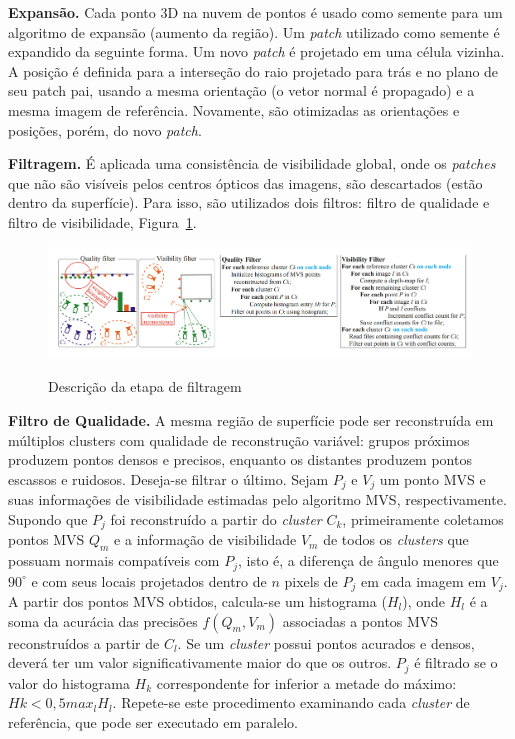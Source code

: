 \noindent\textbf{Expansão.}
Cada ponto 3D na nuvem de pontos é usado como semente para um algoritmo de
expansão (aumento da região). Um \emph{patch} utilizado como semente é expandido
da seguinte forma. Um novo \emph{patch} é projetado em uma célula vizinha.  A
posição é definida para a interseção do raio projetado para trás e no plano de
seu patch pai, usando a mesma orientação (o vetor normal é propagado) e a mesma
imagem de referência.  Novamente, são otimizadas as orientações e posições,
porém, do novo \emph{patch}.	

\noindent\textbf{Filtragem.}
É aplicada uma consistência de visibilidade global, onde os \emph{patches} que
não são visíveis pelos centros ópticos das imagens, são descartados (estão
dentro da superfície). Para isso, são utilizados dois filtros: filtro de
qualidade e filtro de visibilidade, Figura~\ref{fig:filtropmvs}.
\begin{figure}[!h]
	\centering
  \caption{Descrição da etapa de filtragem}
	\includegraphics[width=1\linewidth]{figs/filtropmvs.png}
  \label{fig:filtropmvs}
\end{figure} 

\noindent\textbf{Filtro de Qualidade.}
A mesma região de superfície pode ser reconstruída em múltiplos clusters com
qualidade de reconstrução variável: grupos próximos produzem pontos densos e
precisos, enquanto os distantes produzem pontos escassos e ruidosos.
Deseja-se filtrar o último.  Sejam $P_j$ e $V_j$ um ponto MVS
e suas informações de visibilidade estimadas pelo algoritmo MVS,
respectivamente. Supondo que $P_j$ foi reconstruído a partir do \emph{cluster}
$C_k$, primeiramente coletamos pontos MVS ${Q_m}$ e a informação de
visibilidade ${V_m}$ de todos os \emph{clusters} que possuam normais compatíveis
com $P_j$, isto é, a diferença de ângulo menores que $90^\circ$ e com seus locais
projetados dentro de $n$ pixels de $P_j$ em cada imagem em $V_j$. A partir dos
pontos MVS obtidos, calcula-se um histograma ($H_l$), onde $H_l$ é a soma da
acurácia das precisões $f(Q_m,V_m)$ associadas a pontos MVS reconstruídos a
partir de $C_l$. Se um \emph{cluster} possui pontos acurados e densos,
deverá ter um valor significativamente maior do que os outros. $P_j$ é
filtrado se o valor do histograma $H_k$ correspondente for inferior a metade do
máximo: $Hk < 0,5 max_l H_l$. Repete-se este procedimento examinando cada
\emph{cluster} de referência, que pode ser executado em paralelo. 

